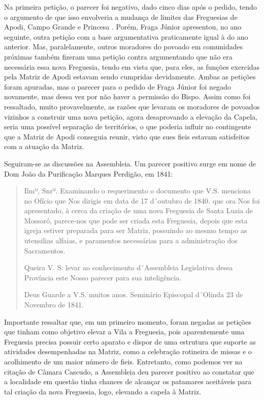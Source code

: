 \begin{refsection}
    Na primeira petição, o parecer foi negativo, dado cinco dias após o pedido, tendo o argumento de que isso envolveria a mudança de limites das Freguesias de Apodi, Campo Grande e Princesa \cite[p.~53]{Cascudo2010Notas}. Porém, Fraga Júnior apresentou, no ano seguinte, outra petição com a base argumentativa praticamente igual à do ano anterior. Mas, paralelamente, outros moradores do povoado em comunidades próximas também fizeram uma petição contra argumentando que não era necessária essa nova Freguesia, tendo em vista que, para eles, as funções exercidas pela Matriz de Apodi estavam sendo cumpridas devidamente. Ambas as petições foram apuradas, mas o parecer para o pedido de Fraga Júnior foi negado novamente, mas dessa vez por não haver a permissão do Bispo. Assim como foi ressaltado, muito provavelmente, as razões que levaram os moradores de povoados vizinhos a construir uma nova petição, agora desaprovando a elevação da Capela, seria uma possível separação de territórios, o que poderia influir no contingente que a Matriz de Apodi conseguia reunir, visto que sues fieis estavam satisfeitos com a atuação da Matriz.

    Seguiram-se as discussões na Assembleia. Um parecer positivo surge em nome de Dom João da Purificação Marques Perdigão, em 1841:

    \begin{quotation}
        Ilmº, Snrº. Examinando o requerimento o documento que V.S. menciona no Ofício que Nos dirigis em data de 17 d´outubro de 1840. que ora Nos foi apresentado, à cerca da criação de uma nova Freguesia de Santa Luzia de Mossoró, parece-nos que pode ser criada esta Freguesia, depois que esta igreja estiver preparada para ser Matriz, possuindo ao mesmo tempo as utensilias alfaias, e paramentos necessárias para a administração dos Sacramentos.

        Queira V. S. levar ao conhecimento d´Assembleia Legislativa dessa Província este Nosso parecer para sua inteligência.   

        Deus Guarde a V.S. muitos anos. Seminário Episcopal d´Olinda 23 de Novembro de 1841. \cite[p.~61--62]{Cascudo2010Notas}
    \end{quotation}

    Importante ressaltar que, em um primeiro momento, foram negadas as petições que tinham como objetivo elevar a Vila a Freguesia, pois aparentemente uma Freguesia precisa possuir certo aparato e dispor de uma estrutura que suporte as atividades desempenhadas na Matriz, como a celebração rotineira de missas e o acolhimento de um maior número de fieis. Entretanto, como podemos ver na citação de Câmara Cascudo, a Assembleia deu parecer positivo ao constatar que a localidade em questão tinha chances de alcançar os patamares aceitáveis para tal criação da nova Freguesia, logo, elevando a capela à Matriz.


\end{refsection}
